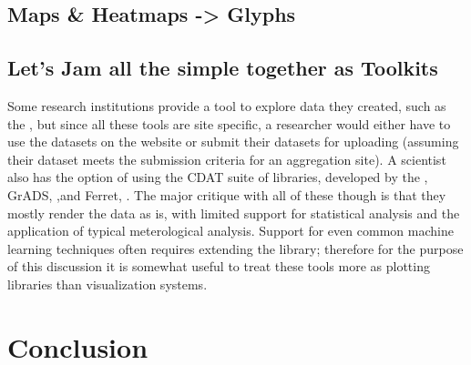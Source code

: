 \documentclass[letterpaper,onecolumn,titlepage]{Ythesis}
\begin{document}
\subsection{Maps & Heatmaps -> Glyphs}     


\subsection{Let's Jam all the simple together as Toolkits}
Some research institutions provide a tool to explore data they created, such as the \cite{src:esrlpsd}, but since all these tools are site specific, a researcher would either have to use the datasets on the website or submit their datasets for uploading 
(assuming their dataset meets the submission criteria for an aggregation site). A scientist also has the option of using the CDAT suite of libraries, developed by the \cite{WilliamsEtAl13}, GrADS, \cite{src:grads},and Ferret, \cite{src:HankinEtAl96}. The major critique with all of these though is that they mostly render the data as is, with limited support for statistical analysis and the application of typical meterological analysis. Support for even common machine learning techniques often requires extending the library; therefore for the purpose of this discussion it is somewhat useful to treat these tools more as plotting libraries than visualization systems. %


\section{Conclusion}
\label{sec:conclusion}


\pagebreak


\end{document}
